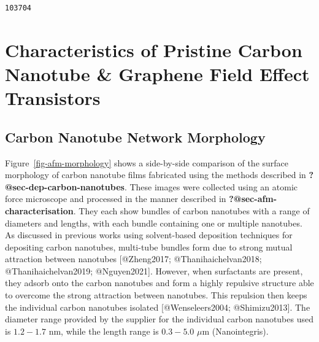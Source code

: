 \documentclass[
  letterpaper,
  DIV=11,
  numbers=noendperiod]{scrartcl}
\author{}
\date{}
\begin{document}
\ifdefined\Shaded\renewenvironment{Shaded}{\begin{tcolorbox}[frame hidden, sharp corners, breakable, boxrule=0pt, enhanced, interior hidden, borderline west={3pt}{0pt}{shadecolor}]}{\end{tcolorbox}}\fi

\begin{verbatim}
103704
\end{verbatim}

\hypertarget{characteristics-of-pristine-carbon-nanotube-graphene-field-effect-transistors}{%
\section{Characteristics of Pristine Carbon Nanotube \& Graphene Field
Effect
Transistors}\label{characteristics-of-pristine-carbon-nanotube-graphene-field-effect-transistors}}

\hypertarget{carbon-nanotube-network-morphology}{%
\subsection{Carbon Nanotube Network
Morphology}\label{carbon-nanotube-network-morphology}}

Figure~\ref{fig-afm-morphology} shows a side-by-side comparison of the
surface morphology of carbon nanotube films fabricated using the methods
described in \textbf{?@sec-dep-carbon-nanotubes}. These images were
collected using an atomic force microscope and processed in the manner
described in \textbf{?@sec-afm-characterisation}. They each show bundles
of carbon nanotubes with a range of diameters and lengths, with each
bundle containing one or multiple nanotubes. As discussed in previous
works using solvent-based deposition techniques for depositing carbon
nanotubes, multi-tube bundles form due to strong mutual attraction
between nanotubes {[}@Zheng2017; @Thanihaichelvan2018;
@Thanihaichelvan2019; @Nguyen2021{]}. However, when surfactants are
present, they adsorb onto the carbon nanotubes and form a highly
repulsive structure able to overcome the strong attraction between
nanotubes. This repulsion then keeps the individual carbon nanotubes
isolated {[}@Wenseleers2004; @Shimizu2013{]}. The diameter range
provided by the supplier for the individual carbon nanotubes used is
\(1.2-1.7\) nm, while the length range is \(0.3-5.0\) \(\mu\)m
(Nanointegris).
\end{document}
